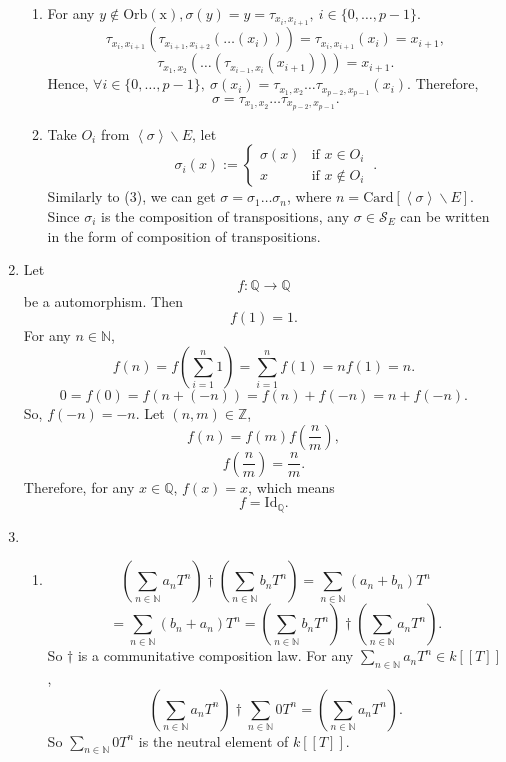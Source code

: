 \documentclass{article}
\newcommand{\NN}{\mathbb{N}}
\newcommand{\ZZ}{\mathbb{Z}}
\newcommand{\QQ}{\mathbb{Q}}
\begin{document}
\begin{enumerate}
\begin{enumerate}
            \item For any $y\notin \mathrm{Orb(x)},\sigma(y)=y=\tau_{x_i,x_{i+1}},\ i\in \{0,\dots,p-1\}$.
                $$\tau_{x_i,x_{i+1}}(\tau_{x_{i+1},x_{i+2}}(\dots(x_i)))=\tau_{x_i,x_{i+1}}(x_i)=x_{i+1},$$
                $$\tau_{x_1,x_2}(\dots(\tau_{x_{i-1},x_i}(x_{i+1})))=x_{i+1}.$$
                Hence, $\forall i\in \{0,\dots,p-1\},\ \sigma(x_i)=\tau_{x_1,x_2}\dots \tau_{x_{p-2},x_{p-1}}(x_i).$ Therefore, 
                $$\sigma=\tau_{x_1,x_2}\dots\tau_{x_{p-2},x_{p-1}}.$$
            \item Take $O_i$ from $ \left \langle \sigma \right \rangle \backslash E$, let 
                $$\sigma_i(x):= \left\{ \begin{matrix}
                    \sigma(x) & \text{if } x\in O_i\\
                    x & \text{if } x\notin O_i
                \end{matrix} \ . \right. $$
                Similarly to (3), we can get $\sigma=\sigma_1\dots\sigma_n$, where $n=\mathrm{Card}[\left \langle \sigma \right \rangle \backslash E]$. Since $\sigma_i$ is the composition of transpositions, any $\sigma\in \mathcal{S}_E$ can be written in the form of composition of transpositions.
        \end{enumerate}
\setcounter{enumi}{4}
    \item Let $$f:\QQ\longrightarrow \QQ$$ be a automorphism. Then $$f(1)=1.$$
        For any $n\in\NN$, 
        $$f(n)=f\left(\sum_{i=1}^{n}1\right)=\sum_{i=1}^{n}f(1)=nf(1)=n.$$
        $$0=f(0)=f(n+(-n))=f(n)+f(-n)=n+f(-n).$$
        So, $f(-n)=-n$. Let $(n,m)\in \ZZ$,
        $$f(n)=f(m)f(\frac{n}{m}),$$
        $$f(\frac{n}{m})=\frac{n}{m}.$$
        Therefore, for any $x\in \QQ$, $f(x)=x$, which means 
        $$f=\mathrm{Id}_{\QQ}.$$
\setcounter{enumi}{9}
\item \begin{enumerate}
            \item $$\left(\sum_{n\in \NN}a_nT^n\right)\dagger \left(\sum_{n\in \NN}b_nT^n\right)=\sum_{n\in \NN}(a_n+b_n)T^n$$
            $$=\sum_{n\in \NN}(b_n+a_n)T^n=\left(\sum_{n\in \NN}b_nT^n\right)\dagger\left(\sum_{n\in \NN}a_nT^n\right).$$
            So $\dagger$ is a communitative composition law.
            \newline
            For any $\sum_{n\in \NN}a_nT^n\in k[[T]]$,
            $$\left(\sum_{n\in \NN}a_nT^n\right)\dagger\sum_{n\in \NN}0T^n=\left(\sum_{n\in \NN}a_nT^n\right).$$
            So $\sum_{n\in\NN}0T^n$ is the neutral element of $k[[T]]$.

\end{enumerate}
\end{enumerate}
\end{document}
